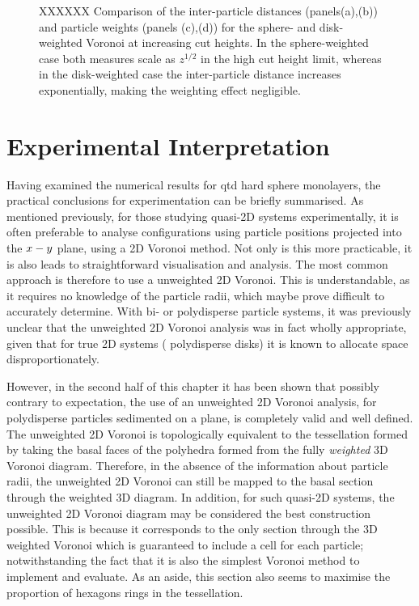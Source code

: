 \begin{figure}
	\caption{XXXXXX Comparison of the inter\--particle distances (panels(a),(b)) and particle weights (panels (c),(d)) for the sphere\-- and disk\--weighted Voronoi at increasing cut heights. In the sphere\--weighted case both measures scale as $z^{1/2}$ in the high cut height limit, whereas in the disk\--weighted case the inter\--particle distance increases exponentially, making the weighting effect negligible.}
	\label{fig:wd}
\end{figure}

\section{Experimental Interpretation}

Having examined the numerical results for qtd{} hard sphere monolayers, the practical conclusions for experimentation can be briefly summarised.
As mentioned previously, for those studying quasi\--2D systems experimentally, it is often preferable to analyse configurations using particle positions projected into the $x\--y$ plane, using a 2D Voronoi method.
Not only is this more practicable, it is also leads to straightforward visualisation and analysis.
The most common approach is therefore to use a unweighted 2D Voronoi.
This is understandable, as it requires no knowledge of the particle radii, which maybe prove difficult to accurately determine.
With bi\-- or polydisperse particle systems, it was previously unclear that the unweighted 2D Voronoi analysis was in fact wholly appropriate, given that for true 2D systems (\eg{} polydisperse disks) it is known to allocate space disproportionately. 
 
However, in the second half of this chapter it has been shown that possibly contrary to expectation, the use of an unweighted 2D Voronoi analysis, for polydisperse particles sedimented on a plane, is completely valid and well defined.
The unweighted 2D Voronoi is topologically equivalent to the tessellation formed by taking the basal faces of the polyhedra formed from the fully \textit{weighted} 3D Voronoi diagram.
Therefore, in the absence of the information about particle radii, the unweighted 2D Voronoi can still be mapped to the basal section through the weighted 3D diagram.
In addition, for such quasi\--2D systems, the unweighted 2D Voronoi diagram may be considered the best construction possible. 
This is because it corresponds to the only section through the 3D weighted Voronoi which is guaranteed to include a cell for each particle; notwithstanding the fact that it is also the simplest Voronoi method to implement and evaluate.
As an aside, this section also seems to maximise the proportion of hexagons rings in the tessellation.

